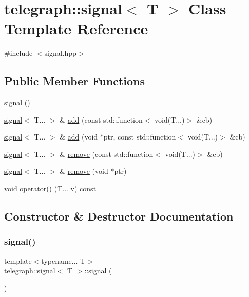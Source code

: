 \hypertarget{classtelegraph_1_1signal}{}\section{telegraph\+:\+:signal$<$ T $>$ Class Template Reference}
\label{classtelegraph_1_1signal}


{\ttfamily \#include $<$signal.\+hpp$>$}

\subsection*{Public Member Functions}
\begin{DoxyCompactItemize}
\item 
\hyperlink{classtelegraph_1_1signal_abfa259e5f14f41325eff136e3d3ae1f6}{signal} ()
\item 
\hyperlink{classtelegraph_1_1signal}{signal}$<$ T... $>$ \& \hyperlink{classtelegraph_1_1signal_a849fca4479774ba132dd72d245bd50f1}{add} (const std\+::function$<$ void(T...)$>$ \&cb)
\item 
\hyperlink{classtelegraph_1_1signal}{signal}$<$ T... $>$ \& \hyperlink{classtelegraph_1_1signal_aa1b6aaaccd54b00fb351677351084af3}{add} (void $\ast$ptr, const std\+::function$<$ void(T...)$>$ \&cb)
\item 
\hyperlink{classtelegraph_1_1signal}{signal}$<$ T... $>$ \& \hyperlink{classtelegraph_1_1signal_a2adad7eecd9f66137706625a08441968}{remove} (const std\+::function$<$ void(T...)$>$ \&cb)
\item 
\hyperlink{classtelegraph_1_1signal}{signal}$<$ T... $>$ \& \hyperlink{classtelegraph_1_1signal_a50b41c05f04a2788e92cc51ff311d302}{remove} (void $\ast$ptr)
\item 
void \hyperlink{classtelegraph_1_1signal_a15ea24d911416785a6e40a14efcf67ce}{operator()} (T... v) const
\end{DoxyCompactItemize}


\subsection{Constructor \& Destructor Documentation}
\mbox{\label{classtelegraph_1_1signal_abfa259e5f14f41325eff136e3d3ae1f6}} 
\subsubsection{\texorpdfstring{signal()}{signal()}}
{\footnotesize\ttfamily template$<$typename... T$>$ \\
\hyperlink{classtelegraph_1_1signal}{telegraph\+::signal}$<$ T $>$\+::\hyperlink{classtelegraph_1_1signal}{signal} (\begin{DoxyParamCaption}{ }\end{DoxyParamCaption})\hspace{0.3cm}{\ttfamily [inline]}}



